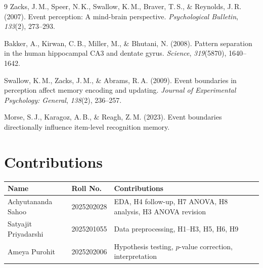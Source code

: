 \documentclass[10pt,a4paper]{article}
\begin{document}
\begin{thebibliography}{9}
Zacks, J.\,M., Speer, N.\,K., Swallow, K.\,M., Braver, T.\,S., \& Reynolds, J.\,R. (2007).
Event perception: A mind-brain perspective.
\textit{Psychological Bulletin}, \textit{133}(2), 273--293.

Bakker, A., Kirwan, C.\,B., Miller, M., \& Bhutani, N. (2008).
Pattern separation in the human hippocampal CA3 and dentate gyrus.
\textit{Science}, \textit{319}(5870), 1640--1642.

Swallow, K.\,M., Zacks, J.\,M., \& Abrams, R.\,A. (2009).
Event boundaries in perception affect memory encoding and updating.
\textit{Journal of Experimental Psychology: General}, \textit{138}(2), 236--257.

Morse, S.\,J., Karagoz, A.\,B., \& Reagh, Z.\,M. (2023).
Event boundaries directionally influence item-level recognition memory.
\end{thebibliography}

\section*{Contributions}

\begin{table}[H]
\centering
\small
\begin{tabular}{lll}
\toprule
\textbf{Name} & \textbf{Roll No.} & \textbf{Contributions} \\
\midrule
Achyutananda Sahoo   & 2025202028 & EDA, H4 follow-up, H7 ANOVA, H8 analysis, H3 ANOVA revision \\
Satyajit Priyadarshi & 2025201055 & Data preprocessing, H1--H3, H5, H6, H9 \\
Ameya Purohit        & 2025202006 & Hypothesis testing, $p$-value correction, interpretation \\
\bottomrule
\end{tabular}
\end{table}
\end{document}
